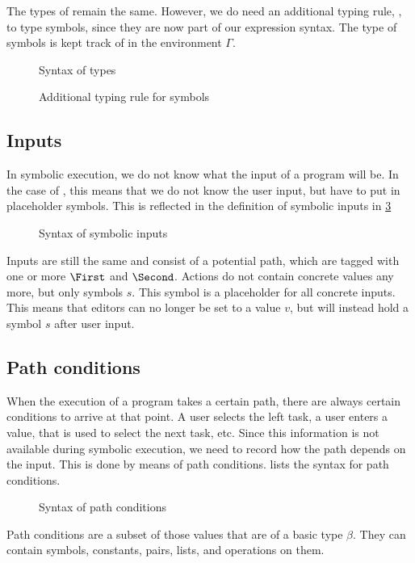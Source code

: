 The types of \TOPHAT remain the same.
However, we do need an additional typing rule, , to type symbols,
since they are now part of our expression syntax.
The type of symbols is kept track of in the environment $\Gamma$.

\begin{figure}[h]
  \small
  \caption{Syntax of \TOPHAT types}
  \label{fig:syntaxtypes}
\end{figure}

\begin{figure}[h]
  \small
  \caption{Additional typing rule for symbols}
  \label{fig:typingsymbol}
\end{figure}


\subsection{Inputs}

In symbolic execution, we do not know what the input of a program will be.
In the case of \TOPHAT, this means that we do not know the user input, but have to put in placeholder symbols.
This is reflected in the definition of symbolic inputs in \cref{fig:syntaxinputs}

\begin{figure}[h]
  \small
  \caption{Syntax of symbolic inputs}
  \label{fig:syntaxinputs}
\end{figure}

Inputs are still the same and consist of a potential path, which are tagged with one or more $\First$ and $\Second$.
Actions do not contain concrete values any more, but only symbols $s$.
This symbol is a placeholder for all concrete inputs.
This means that editors can no longer be set to a value $v$, but will instead hold a symbol $s$ after user input.


\subsection{Path conditions}

When the execution of a \TOPHAT program takes a certain path, there are always certain conditions to arrive at that point.
A user selects the left task, a user enters a value, that is used to select the next task, etc.
Since this information is not available during symbolic execution, we need to record how the path depends on the input.
This is done by means of path conditions.
 lists the syntax for path conditions.

\begin{figure}[h]
  \small
  \caption{Syntax of path conditions}
  \label{fig:syntaxpredicates}
\end{figure}

Path conditions are a subset of those values that are of a basic type $\beta$.
They can contain symbols, constants, pairs, lists, and operations on them.
